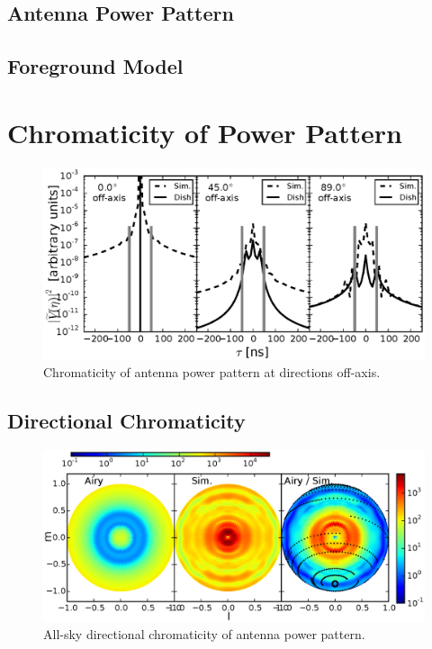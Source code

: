 \documentclass[preprint2,iop,numberedappendix,twocolappendix,appendixfloats]{emulateapj}
\begin{document}
\subsection{Antenna Power Pattern}

\citep{neb15}

\subsection{Foreground Model}\label{sec:foreground}

\section{Chromaticity of Power Pattern}

\begin{figure}[htb]
\centering
\includegraphics[width=\linewidth]{off-axis_point_source_beam_chromaticity.eps}
\caption{Chromaticity of antenna power pattern at directions off-axis. }
\label{fig:off-axis-beam-chromaticity}
\end{figure}

\subsection{Directional Chromaticity}

\begin{figure}[htb]
\centering
\includegraphics[width=\linewidth]{directional_high_delay_average_in_beam.eps}
\caption{All-sky directional chromaticity of antenna power pattern. }
\label{fig:directional-beam-chromaticity}
\end{figure}
\end{document}
